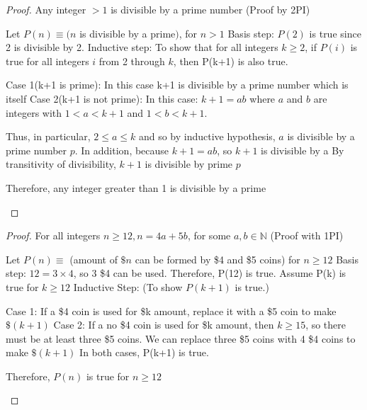 \documentclass[a4paper]{article}
\theoremstyle{definition}
\begin{document}
\begin{proof} Any integer $> 1$ is divisible by a prime number (Proof by 2PI)
  \begin{numpf}
    \pfln Let $P(n) \equiv (n$ is divisible by a prime$)$, for $n > 1$
    \pfln Basis step: $P(2)$ is true since 2 is divisible by 2.
    \pfln Inductive step: To show that for all integers $k \geq 2$, if $P(i)$ is true for all integers $i$ from 2 through $k$, then P(k+1) is also true.
    \begin{subpf}
      \pfln Case 1(k+1 is prime): In this case k+1 is divisible by a prime number which is itself
      \pfln Case 2(k+1 is not prime): In this case: $k+1 = ab$ where $a$ and $b$ are integers with $1 < a < k + 1$ and $1 < b < k + 1$.
      \begin{subpf}
        \pfln Thus, in particular, $2 \leq a \leq k$ and so by inductive hypothesis, $a$ is divisible by a prime number $p$.
        \pfln In addition, because $k+1 = ab$, so $k + 1$ is divisible by a
        \pfln By transitivity of divisibility, $k+1$ is divisible by prime $p$
      \end{subpf}
    \end{subpf}
    \pfln Therefore, any integer greater than 1 is divisible by a prime
  \end{numpf}
\end{proof}

\begin{proof} For all integers $n \geq 12, n = 4a + 5b$, for some $a,b \in \mathbb{N}$ (Proof with 1PI)
  \begin{numpf}
    \pfln Let $P(n) \equiv$ (amount of $\$n$ can be formed by \$4 and \$5 coins) for $n \geq 12$
    \pfln Basis step: $12 = 3 \times 4$, so 3 \$4 can be used. Therefore, P(12) is true.
    \pfln Assume P(k) is true for $k \geq 12$
    \pfln Inductive Step: (To show $P(k+1)$ is true.)
    \begin{subpf}
      \pfln Case 1: If a \$4 coin is used for \$k amount, replace it with a \$5 coin to make $\$(k+1)$
      \pfln Case 2: If a no \$4 coin is used for \$k amount, then $k \geq 15$, so there must be at least three \$5 coins. We can replace three \$5 coins with 4 \$4 coins to make $\$(k+1)$
      \pfln In both cases, P(k+1) is true. 
    \end{subpf}
    \pfln Therefore, $P(n)$ is true for $n \geq 12$
  \end{numpf}
\end{proof}
\end{document}
